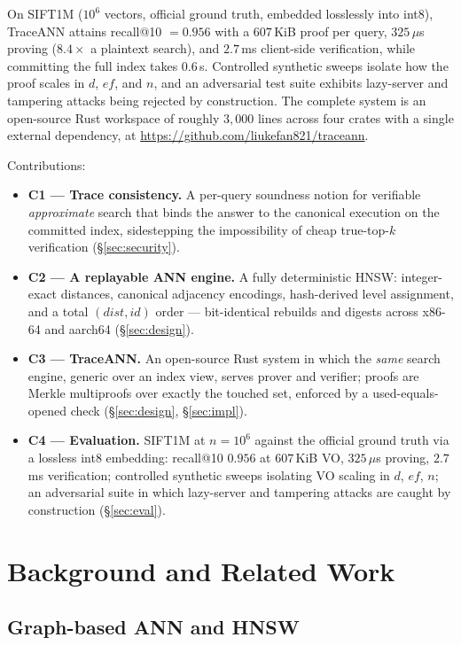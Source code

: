 \documentclass[11pt]{article}
\newcommand{\sys}{TraceANN}
\begin{document}
On SIFT1M ($10^6$ vectors, official ground truth, embedded losslessly
into int8), \sys{} attains recall@10 $=0.956$ with a $607$\,KiB proof per
query, $325\,\mu$s proving ($8.4\times$ a plaintext search), and
$2.7$\,ms client-side verification, while committing the full index
takes $0.6$\,s. Controlled synthetic sweeps isolate how the proof scales
in $d$, $\mathit{ef}$, and $n$, and an adversarial test suite exhibits
lazy-server and tampering attacks being rejected by construction. The
complete system is an open-source Rust workspace of roughly $3{,}000$
lines across four crates with a single external dependency, at
\url{https://github.com/liukefan821/traceann}.

Contributions:
\begin{itemize}
  \item \textbf{C1 --- Trace consistency.} A per-query soundness notion
  for verifiable \emph{approximate} search that binds the answer to the
  canonical execution on the committed index, sidestepping the
  impossibility of cheap true-top-$k$ verification
  (\S\ref{sec:security}).
  \item \textbf{C2 --- A replayable ANN engine.} A fully deterministic
  HNSW: integer-exact distances, canonical adjacency encodings,
  hash-derived level assignment, and a total
  $(\mathit{dist},\mathit{id})$ order --- bit-identical rebuilds and
  digests across x86-64 and aarch64 (\S\ref{sec:design}).
  \item \textbf{C3 --- \sys{}.} An open-source Rust system in which the
  \emph{same} search engine, generic over an index view, serves prover
  and verifier; proofs are Merkle multiproofs over exactly the touched
  set, enforced by a used-equals-opened check (\S\ref{sec:design},
  \S\ref{sec:impl}).
  \item \textbf{C4 --- Evaluation.} SIFT1M at $n{=}10^6$ against the
  official ground truth via a lossless int8 embedding: recall@10
  $0.956$ at $607$\,KiB VO, $325\,\mu$s proving, $2.7$\,ms verification;
  controlled synthetic sweeps isolating VO scaling in $d$, $ef$, $n$;
  an adversarial suite in which lazy-server and tampering attacks are
  caught by construction (\S\ref{sec:eval}).
\end{itemize}

\section{Background and Related Work}\label{sec:related}

\subsection{Graph-based ANN and HNSW}
\end{document}
